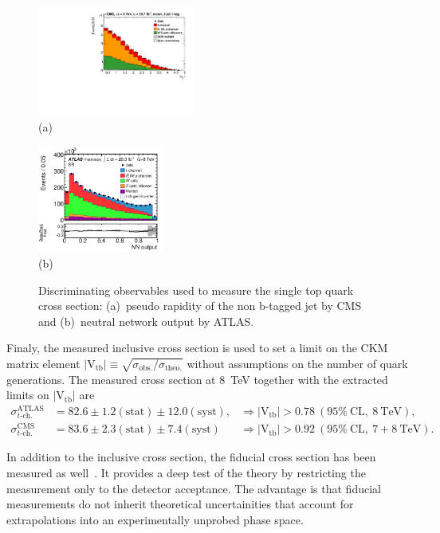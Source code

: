 \documentclass{PoS}
\begin{document}
\begin{figure}[htbp]
\begin{center}
\parbox[t]{0.5\textwidth}{\centering\includegraphics[width=0.46\textwidth]{cms_xsec8/etamuon.pdf}\\(a)}
\parbox[t]{0.42\textwidth}{\centering\includegraphics[width=0.37\textwidth]{atlas_xsec8/nnoutput.pdf}\\(b)}

\end{center}
\caption{\label{fig:fit-xsec-8}Discriminating observables used to measure the single top quark cross section: (a)~pseudo rapidity of the non b-tagged jet by CMS and (b)~neutral network output by ATLAS.}

\end{figure}

Finaly, the measured inclusive cross section is used to set a limit on the CKM matrix element $|\mathrm{V_{tb}}|\equiv\sqrt{\sigma_\mathrm{obs.}/\sigma_\mathrm{theo.}}$ without assumptions on the number of quark generations. The measured cross section at 8~TeV together with the extracted limits on $\mathrm{|V_{tb}|}$ are 
\begin{align}
\sigma_{t\mbox{-}\mathrm{ch.}}^\mathrm{ATLAS}&=82.6\pm1.2\mathrm{(stat)}\pm12.0\mathrm{(syst)}, &\Rightarrow |\mathrm{V_{tb}}|>0.78~\mathrm{(95\%~CL,~8~TeV)}, \\
\sigma_{t\mbox{-}\mathrm{ch.}}^\mathrm{CMS}&=83.6\pm2.3\mathrm{(stat)}\pm7.4\mathrm{(syst)} &\Rightarrow |\mathrm{V_{tb}}|>0.92~\mathrm{(95\%~CL,~7+8~TeV)}.
\end{align}

In addition to the inclusive cross section, the fiducial cross section has been measured as well~\cite{atlas-xsec8,CMS-PAS-TOP-15-007}. It provides a deep test of the theory by restricting the measurement only to the detector acceptance. The advantage is that fiducial measurements do not inherit theoretical uncertainities that account for extrapolations into an experimentally unprobed phase space.
\end{document}
